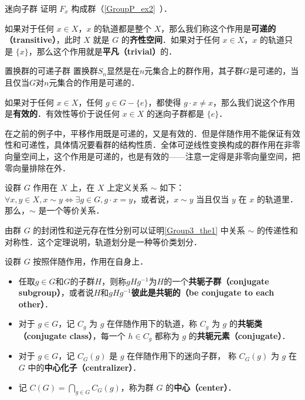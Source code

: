 \begin{exercise}{迷向子群}\label{Group3_exe1}
证明 $F_x$ 构成群（\autoref{GroupP_ex2}~）．
\end{exercise}

\begin{definition}{}
如果对于任何 $x\in X$，$x$ 的轨道都是整个 $X$，那么我们称这个作用是\textbf{可递的（transitive）}，此时 $X$ 就是 $G$ 的\textbf{齐性空间}．如果对于任何 $x\in X$，$x$ 的轨道只是 $\{x\}$，那么这个作用就是\textbf{平凡（trivial）}的．
\end{definition}

\begin{example}{置换群的可递子群}\label{Group3_ex4}
置换群$S_n$显然是在$n$元集合上的群作用，其子群$G$是可递的，当且仅当$G$对$n$元集合的作用是可递的．
\end{example}

如果对于任何 $x\in X$，任何 $g\in G-\{e\}$，都使得 $g\cdot x\not=x$，那么我们说这个作用是\textbf{有效的}．有效性等价于说任何 $x\in X$ 的迷向子群都是 $\{e\}$．

在之前的例子中，平移作用既是可递的，又是有效的．但是伴随作用不能保证有效性和可递性，具体情况要看群的结构性质．全体可逆线性变换构成的群作用在非零向量空间上，这个作用是可递的，也是有效的——注意一定得是非零向量空间，把零向量排除在外．

\begin{theorem}{}\label{Group3_the1}
设群 $G$ 作用在 $X$ 上，在 $X$ 上定义关系 $\sim$ 如下：$\forall x, y\in X, x\sim y \iff \exists g\in G, g\cdot x=y$，或者说，$x\sim y$ 当且仅当 $y$ 在 $x$ 的轨道里．那么，$\sim$ 是一个等价关系．
\end{theorem}

由群 $G$ 的封闭性和逆元存在性分别可以证明\autoref{Group3_the1} 中关系 $\sim$ 的传递性和对称性．这个定理说明，轨道划分是一种等价类划分．

\begin{definition}{}
设群 $G$ 按照伴随作用，作用在自身上．
\begin{itemize}
\item 任取$g\in G$和$G$的子群$H$，则称$gHg^{-1}$为$H$的一个\textbf{共轭子群（conjugate subgroup）}，或者说$H$和$gHg^{-1}$\textbf{彼此是共轭的（be conjugate to each other）}．
\item 对于 $g\in G$，记 $C_g$ 为 $g$ 在伴随作用下的轨道，称 $C_g$ 为 $g$ 的\textbf{共轭类（conjugate class）}，每一个 $h\in C_g$ 都称为 $g$ 的\textbf{共轭元素（conjugate）}．

\item 对于 $g\in G$，记 $C_G(g)$ 是 $g$ 在伴随作用下的迷向子群， 称 $C_G(g)$ 为 $g$ 在 $G$ 中的\textbf{中心化子（centralizer）}．

\item 记 $C(G)=\bigcap_{g\in G} C_G(g)$，称为群 $G$ 的\textbf{中心（center）}．
\end{itemize}
\end{definition}

